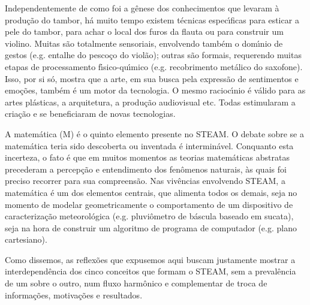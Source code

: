 \documentclass[
12pt,		%
openright,	%
twoside,  %
a4paper,			%
chapter=TITLE,		%
english,			%
french,				%
spanish,			%
brazil				%
]{USPSC-classe/USPSC}
\begin{document}
Independentemente de como foi a g\^enese dos conhecimentos que levaram \`a produ\c{c}\~ao do tambor, h\'a muito tempo existem t\'ecnicas espec\'{\i}ficas para esticar a pele do tambor, para achar o local dos furos da flauta ou para construir um violino. Muitas s\~ao totalmente sensoriais, envolvendo tamb\'em o dom\'{\i}nio de gestos (e.g. entalhe do pesco\c{c}o do viol\~ao); outras s\~ao formais, requerendo muitas etapas de processamento f\'{\i}sico-qu\'{\i}mico (e.g. recobrimento met\'alico do saxofone). Isso, por si s\'o, mostra que a arte, em sua busca pela express\~ao de sentimentos e emo\c{c}\~oes, tamb\'em \'e um motor da tecnologia. O mesmo racioc\'{\i}nio \'e v\'alido para as artes pl\'asticas, a arquitetura, a produ\c{c}\~ao audiovisual etc. Todas estimularam a cria\c{c}\~ao e se beneficiaram de novas tecnologias.








A matem\'atica (M) \'e o quinto elemento presente no STEAM. O debate sobre se a matem\'atica teria sido descoberta ou inventada \'e intermin\'avel. Conquanto esta incerteza, o fato \'e que em muitos momentos as teorias matem\'aticas abstratas precederam a percep\c{c}\~ao e entendimento dos fen\^omenos naturais, \`as quais foi preciso recorrer para sua compreens\~ao. Nas viv\^encias envolvendo STEAM, a matem\'atica \'e um dos elementos centrais, que alimenta todos os demais, seja no momento de modelar geometricamente o comportamento de um dispositivo de caracteriza\c{c}\~ao meteorol\'ogica (e.g. pluvi\^ometro de b\'ascula baseado em sucata), seja na hora de construir um algoritmo de programa de computador (e.g. plano cartesiano).








Como dissemos, as reflex\~oes que expusemos aqui buscam justamente mostrar a interdepend\^encia dos cinco conceitos que formam o STEAM, sem a preval\^encia de um sobre o outro, num fluxo harm\^onico e complementar de troca de informa\c{c}\~oes, motiva\c{c}\~oes e resultados.









\noindent\begin{center}\mbox{\centering{}}\end{center}
\end{document}
